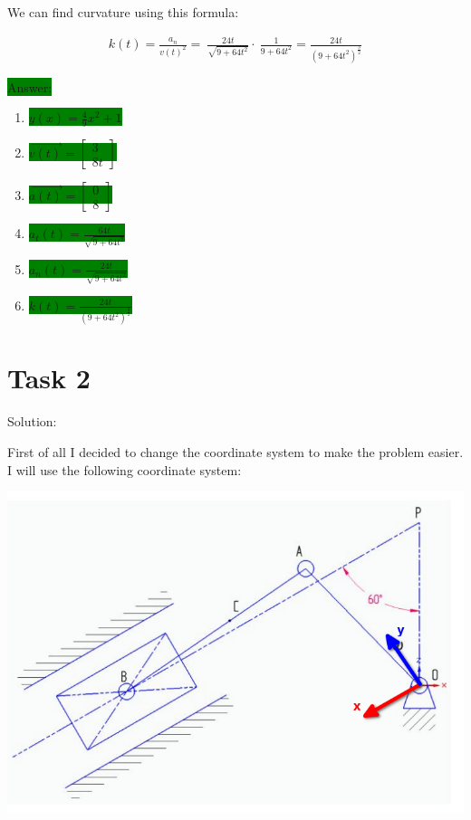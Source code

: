 \documentclass{article}
\begin{document}
We can find curvature using this formula:

\begin{align}
    k(t) = \frac{a_n}{v(t)^2} = \
    \frac{24t}{\sqrt{9 + 64t^2}} \cdot \
    \frac{1}{9 + 64t^2} =
    \frac{24t}{(9 + 64t^2)^\frac{3}{2}}
\end{align}

\colorbox{green}{Answer:}

\begin{enumerate}
    \item \colorbox{green}{$y(x) = \frac{4}{9}x^2 + 1$}
    \item \colorbox{green}{$\vec{v(t)} = \begin{bmatrix}
                      3 \\
                      8t
                  \end{bmatrix}$}
    \item \colorbox{green}{$\vec{a(t)} = \begin{bmatrix}
                      0 \\
                      8
                  \end{bmatrix}$}
    \item \colorbox{green}{$a_t(t) = \frac{64t}{\sqrt{9 + 64t^2}}$}
    \item \colorbox{green}{$a_n(t) = \frac{24t}{\sqrt{9 + 64t^2}}$}
    \item \colorbox{green}{$k(t) = \frac{24t}{(9 + 64t^2)^\frac{3}{2}}$}
\end{enumerate}

\newpage

\section{Task 2}

Solution:

First of all I decided to change the coordinate system to make the problem easier. I will use the following coordinate system:

\includegraphics[width=\textwidth]{newcoordsystem.png}
\end{document}

